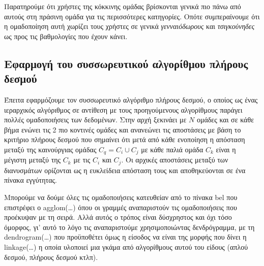 \begin{figure}[h]
\end{figure}

Παρατηρούμε ότι χρήστες της κόκκινης ομάδας βρίσκονται γενικά πιο πάνω από αυτούς στη πράσινη ομάδα για τις περισσότερες κατηγορίες.
Οπότε συμπεραίνουμε ότι η ομαδοποίηση αυτή χωρίζει τους χρήστες σε γενικά \textit{γενναιόδωρους} και \textit{τσιγκούνηδες} ως προς τις βαθμολογίες που έχουν κάνει.

\subsection{Εφαρμογή του συσσωρευτικού αλγορίθμου πλήρους δεσμού}
Έπειτα εφαρμόζουμε τον συσσωρευτικό αλγόριθμο πλήρους δεσμού, ο οποίος ως ένας ιεραρχικός αλγόριθμος σε αντίθεση με τους προηγούμενους αλγορίθμους παράγει πολλές ομαδοποιήσεις των δεδομένων.
Στην αρχή ξεκινάει με \(N\) ομάδες και σε κάθε βήμα ενώνει τις 2 πιο κοντινές ομάδες και ανανεώνει τις αποστάσεις με βάση το κριτήριο πλήρους δεσμού που σημαίνει ότι μετά από κάθε ενοποίηση η απόσταση μεταξύ της καινούργιας ομάδας \(C_q = C_i \cup C_j\) με κάθε παλιά ομάδα \(C_k\) είναι η μέγιστη μεταξύ της \(C_k\) με τις \(C_i\) και \(C_j\).
Οι αρχικές αποστάσεις μεταξύ των διανυσμάτων ορίζονται ως η ευκλείδεια απόσταση τους και αποθηκεύονται σε ένα πίνακα εγγύτητας.

Μπορούμε να δούμε όλες τις ομαδοποιήσεις κατευθείαν από το πίνακα bel που επιστρέφει ο agglom(\dots) όπου οι γραμμές αναπαριστούν τις ομαδοποιήσεις που προέκυψαν με τη σειρά.
Αλλά αυτός ο τρόπος είναι δύσχρηστος και όχι τόσο όμορφος, γι’ αυτό το λόγο τις αναπαριστούμε χρησιμοποιώντας δενδρόγραμμα, με τη dendrogram(\dots) που προϋποθέτει όμως η είσοδος να είναι της μορφής που δίνει η linkage(\dots) η οποία υλοποιεί μια γκάμα από αλγορίθμους αυτού του είδους (απλού δεσμού, πλήρους δεσμού κτλπ).


